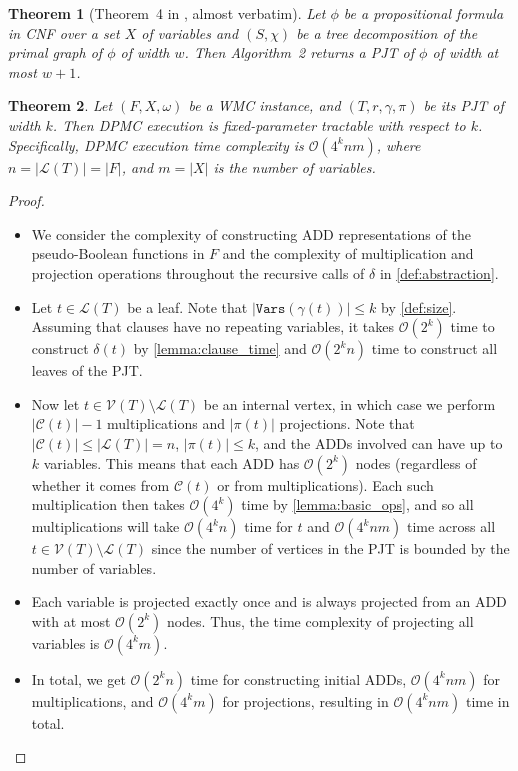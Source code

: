 \documentclass{article}
\newtheorem{theorem}{Theorem}
\theoremstyle{definition}
\theoremstyle{remark}
\begin{document}
\begin{theorem}[Theorem~4 in \cite{DBLP:conf/cp/DudekPV20}, almost
  verbatim] \label{thm:connection}
  Let $\phi$ be a propositional formula in CNF over a set $X$ of variables and
  $(S, \chi)$ be a tree decomposition of the primal graph of $\phi$ of width
  $w$. Then Algorithm~2 returns a PJT of $\phi$ of width at most $w+1$.
\end{theorem}

\begin{theorem}
  Let $(F, X, \omega)$ be a WMC instance, and $(T, r, \gamma, \pi)$ be its PJT
  of width $k$. Then \textsc{DPMC} execution is fixed-parameter tractable with
  respect to $k$. Specifically, \textsc{DPMC} execution time complexity is
  $\mathcal{O}(4^knm)$, where $n = |\mathcal{L}(T)| = |F|$, and $m = |X|$ is the
  number of variables.
\end{theorem}
\begin{proof}
  \begin{itemize}
  \item We consider the complexity of constructing ADD representations of the
    pseudo-Boolean functions in $F$ and the complexity of multiplication and
    projection operations throughout the recursive calls of $\delta$ in
    \cref{def:abstraction}.
  \item Let $t \in \mathcal{L}(T)$ be a leaf. Note that
    $|\mathtt{Vars}(\gamma(t))| \le k$ by \cref{def:size}. Assuming that clauses
    have no repeating variables, it takes $\mathcal{O}(2^k)$ time to construct
    $\delta(t)$ by \cref{lemma:clause_time} and $\mathcal{O}(2^kn)$ time to
    construct all leaves of the PJT.
  \item Now let $t \in \mathcal{V}(T) \setminus \mathcal{L}(T)$ be an internal
    vertex, in which case we perform $|\mathcal{C}(t)|-1$ multiplications and
    $|\pi(t)|$ projections. Note that $|\mathcal{C}(t)| \le |\mathcal{L}(T)| =
    n$, $|\pi(t)| \le k$, and the ADDs involved can have up to $k$ variables.
    This means that each ADD has $\mathcal{O}(2^k)$ nodes (regardless of whether
    it comes from $\mathcal{C}(t)$ or from multiplications). Each such
    multiplication then takes $\mathcal{O}(4^k)$ time by \cref{lemma:basic_ops},
    and so all multiplications will take $\mathcal{O}(4^kn)$ time for $t$ and
    $\mathcal{O}(4^knm)$ time across all $t \in \mathcal{V}(T) \setminus
    \mathcal{L}(T)$ since the number of vertices in the PJT is bounded by the
    number of variables.
  \item Each variable is projected exactly once and is always projected from
    an ADD with at most $\mathcal{O}(2^k)$ nodes. Thus, the time complexity of
    projecting all variables is $\mathcal{O}(4^km)$.
  \item In total, we get $\mathcal{O}(2^kn)$ time for constructing initial ADDs,
    $\mathcal{O}(4^knm)$ for multiplications, and $\mathcal{O}(4^km)$ for
    projections, resulting in $\mathcal{O}(4^knm)$ time in total.
  \end{itemize}
\end{proof}



\end{document}
